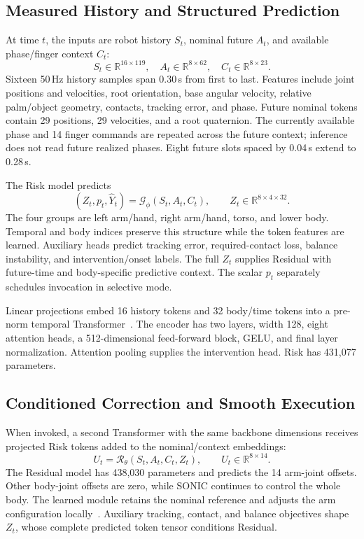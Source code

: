 \documentclass[letterpaper,10pt,conference]{ieeeconf}
\newcommand{\Risk}{\mathcal{G}_{\phi}}
\newcommand{\Res}{\mathcal{R}_{\theta}}
\begin{document}
\subsection{Measured History and Structured Prediction}
At time $t$, the inputs are robot history $S_t$, nominal future $A_t$, and available phase/finger context $C_t$:
\begin{equation}
 S_t\in\mathbb{R}^{16\times119},\quad
 A_t\in\mathbb{R}^{8\times62},\quad
 C_t\in\mathbb{R}^{8\times23}.
\end{equation}
Sixteen 50\,Hz history samples span 0.30\,s from first to last. Features include joint positions and velocities, root orientation, base angular velocity, relative palm/object geometry, contacts, tracking error, and phase. Future nominal tokens contain 29 positions, 29 velocities, and a root quaternion. The currently available phase and 14 finger commands are repeated across the future context; inference does not read future realized phases. Eight future slots spaced by 0.04\,s extend to 0.28\,s.

The Risk model predicts
\begin{equation}
 (Z_t,p_t,\widehat{Y}_t)=\Risk(S_t,A_t,C_t),\qquad
 Z_t\in\mathbb{R}^{8\times4\times32}.
 \label{eq:risk}
\end{equation}
The four groups are left arm/hand, right arm/hand, torso, and lower body. Temporal and body indices preserve this structure while the token features are learned. Auxiliary heads predict tracking error, required-contact loss, balance instability, and intervention/onset labels. The full $Z_t$ supplies Residual with future-time and body-specific predictive context. The scalar $p_t$ separately schedules invocation in selective mode.

Linear projections embed 16 history tokens and 32 body/time tokens into a pre-norm temporal Transformer~\cite{transformer}. The encoder has two layers, width 128, eight attention heads, a 512-dimensional feed-forward block, GELU, and final layer normalization. Attention pooling supplies the intervention head. Risk has 431,077 parameters.

\subsection{Conditioned Correction and Smooth Execution}
When invoked, a second Transformer with the same backbone dimensions receives projected Risk tokens added to the nominal/context embeddings:
\begin{equation}
 U_t=\Res(S_t,A_t,C_t,Z_t),\qquad U_t\in\mathbb{R}^{8\times14}.
\end{equation}
The Residual model has 438,030 parameters and predicts the 14 arm-joint offsets. Other body-joint offsets are zero, while SONIC continues to control the whole body. The learned module retains the nominal reference and adjusts the arm configuration locally~\cite{residual}. Auxiliary tracking, contact, and balance objectives shape $Z_t$, whose complete predicted token tensor conditions Residual.
\end{document}
